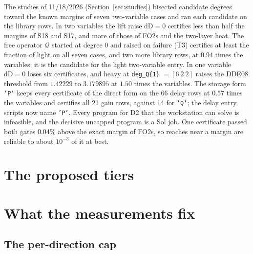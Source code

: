 \documentclass[12pt]{article}
\newcommand{\mcl}[1]{\mathcal{#1}}
\newcommand{\code}[1]{\texttt{#1}}
\theoremstyle{plain}
\theoremstyle{definition}
\theoremstyle{remark}
\begin{document}
The studies of 11/18/2026 (Section~\ref{sec:studies}) bisected candidate degrees toward the known margins of seven two-variable cases and ran each candidate on the library rows. In two variables the lift raise $\mathrm{dD}=0$ certifies less than half the margins of S18 and S17, and more of those of FO2s and the two-layer heat. The free operator $\mcl Q$ started at degree $0$ and raised on failure (T3) certifies at least the fraction of light on all seven cases, and two more library rows, at $0.94$ times the variables; it is the candidate for the light two-variable entry. In one variable $\mathrm{dD}=0$ loses six certificates, and heavy at \code{deg\_Q\{1\}} $=[6\ 2\ 2]$ raises the DDE08 threshold from $1.42229$ to $3.179895$ at $1.50$ times the variables. The storage form \code{'P'} keeps every certificate of the direct form on the 66 delay rows at $0.57$ times the variables and certifies all 21 gain rows, against 14 for \code{'Q'}; the delay entry scripts now name \code{'P'}. Every program for D2 that the workstation can solve is infeasible, and the decisive uncapped program is a Sol job. One certificate passed both gates $0.04\%$ above the exact margin of FO2s, so reaches near a margin are reliable to about $10^{-3}$ of it at best.



\section{The proposed tiers}\label{sec:tiers-new}





\section{What the measurements fix}\label{sec:fix}





\subsection{The per-direction cap}\label{sec:cap}


\end{document}
